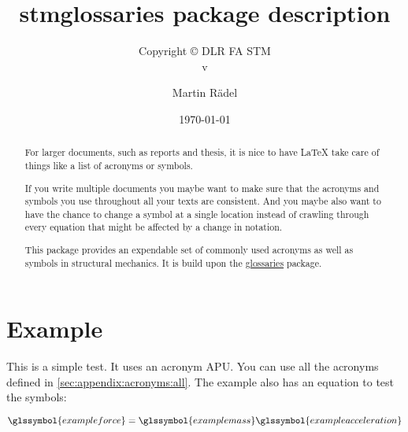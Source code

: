 \documentclass{scrartcl}
\author{Martin R\"{a}del}
\title{stmglossaries package description}
\subtitle{Copyright \copyright{} \the\year{} DLR FA STM\\v\DTMsetdatestyle{versiondate}\DTMtoday}
\date{\today}
\begin{document}
\maketitle

\begin{abstract}
For larger documents, such as reports and thesis, it is nice to have \LaTeX{} take care of things like a list of acronyms or symbols.

If you write multiple documents you maybe want to make sure that the acronyms and symbols you use throughout all your texts are consistent. And you maybe also want to have the chance to change a symbol at a single location instead of crawling through every equation that might be affected by a change in notation.

This package provides an expendable set of commonly used acronyms as well as symbols in structural mechanics. It is build upon the \href{https://ctan.org/pkg/glossaries?lang=en}{glossaries} package.
\end{abstract}

\tableofcontents

\section{Example}

This is a simple test. It uses an acronym \gls{APU}. You can use all the acronyms defined in \autoref{sec:appendix:acronyms:all}. The example also has an equation to test the symbols:


\begin{equation}  
\glssymbol{exampleforce} = \glssymbol{examplemass}\glssymbol{exampleacceleration}
\end{equation}

% 
% 
\end{document}
